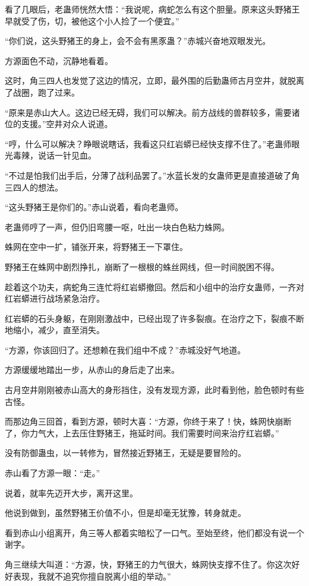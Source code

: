 \begin{this_body}
看了几眼后，老蛊师恍然大悟：“我说呢，病蛇怎么有这个胆量。原来这头野猪王早就受了伤，切，被他这个小人捡了一个便宜。”

“你们说，这头野猪王的身上，会不会有黑豕蛊？”赤城兴奋地双眼发光。

方源面色不动，沉静地看着。

这时，角三四人也发觉了这边的情况，立即，最外围的后勤蛊师古月空井，就脱离了战圈，跑了过来。

“原来是赤山大人。这边已经无碍，我们可以解决。前方战线的兽群较多，需要诸位的支援。”空井对众人说道。

“哼，什么可以解决？睁眼说瞎话，我看这只红岩蟒已经快支撑不住了。”老蛊师眼光毒辣，说话一针见血。

“不过是怕我们出手后，分薄了战利品罢了。”水蓝长发的女蛊师更是直接道破了角三四人的想法。

“这头野猪王是你们的。”赤山说着，看向老蛊师。

老蛊师哼了一声，但仍旧弯腰一呕，吐出一块白色粘力蛛网。

蛛网在空中一扩，铺张开来，将野猪王一下罩住。

野猪王在蛛网中剧烈挣扎，崩断了一根根的蛛丝网线，但一时间脱困不得。

趁着这个功夫，病蛇角三连忙将红岩蟒撤回。然后和小组中的治疗女蛊师，一齐对红岩蟒进行战场紧急治疗。

红岩蟒的石头身躯，在刚刚激战中，已经出现了许多裂痕。在治疗之下，裂痕不断地缩小，减少，直至消失。

“方源，你该回归了。还想赖在我们组中不成？”赤城没好气地道。

方源缓缓地踏出一步，从赤山的身后走了出来。

古月空井刚刚被赤山高大的身形挡住，没有发现方源，此时看到他，脸色顿时有些古怪。

而那边角三回首，看到方源，顿时大喜：“方源，你终于来了！快，蛛网快崩断了，你力气大，上去压住野猪王，拖延时间。我们需要时间来治疗红岩蟒。”

没有防御蛊虫，以一转修为，冒然接近野猪王，无疑是要冒险的。

赤山看了方源一眼：“走。”

说着，就率先迈开大步，离开这里。

他说到做到，虽然野猪王价值不小，但是却毫无犹豫，转身就走。

看到赤山小组离开，角三等人都着实暗松了一口气。至始至终，他们都没有说一个谢字。

角三继续大叫道：“方源，快，野猪王的力气很大，蛛网快支撑不住了。你这次好好表现，我就不追究你擅自脱离小组的举动。”


\end{this_body}
